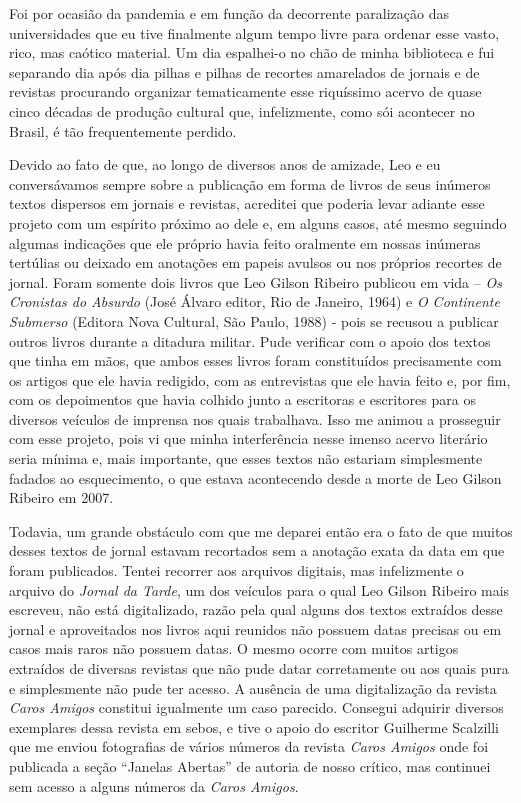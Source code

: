 \documentclass[
  a4paper,
  oneside]{scrbook}
\begin{document}
Foi por ocasião da pandemia e em função da decorrente paralização das
universidades que eu tive finalmente algum tempo livre para ordenar esse
vasto, rico, mas caótico material. Um dia espalhei-o no chão de minha
biblioteca e fui separando dia após dia pilhas e pilhas de recortes
amarelados de jornais e de revistas procurando organizar tematicamente
esse riquíssimo acervo de quase cinco décadas de produção cultural que,
infelizmente, como sói acontecer no Brasil, é tão frequentemente
perdido.

Devido ao fato de que, ao longo de diversos anos de amizade, Leo e eu
conversávamos sempre sobre a publicação em forma de livros de seus
inúmeros textos dispersos em jornais e revistas, acreditei que poderia
levar adiante esse projeto com um espírito próximo ao dele e, em alguns
casos, até mesmo seguindo algumas indicações que ele próprio havia feito
oralmente em nossas inúmeras tertúlias ou deixado em anotações em papeis
avulsos ou nos próprios recortes de jornal. Foram somente dois livros
que Leo Gilson Ribeiro publicou em vida -- \emph{Os Cronistas do
Absurdo} (José Álvaro editor, Rio de Janeiro, 1964) e \emph{O Continente
Submerso} (Editora Nova Cultural, São Paulo, 1988) - pois se recusou a
publicar outros livros durante a ditadura militar. Pude verificar com o
apoio dos textos que tinha em mãos, que ambos esses livros foram
constituídos precisamente com os artigos que ele havia redigido, com as
entrevistas que ele havia feito e, por fim, com os depoimentos que havia
colhido junto a escritoras e escritores para os diversos veículos de
imprensa nos quais trabalhava. Isso me animou a prosseguir com esse
projeto, pois vi que minha interferência nesse imenso acervo literário
seria mínima e, mais importante, que esses textos não estariam
simplesmente fadados ao esquecimento, o que estava acontecendo desde a
morte de Leo Gilson Ribeiro em 2007.

Todavia, um grande obstáculo com que me deparei então era o fato de que
muitos desses textos de jornal estavam recortados sem a anotação exata
da data em que foram publicados. Tentei recorrer aos arquivos digitais,
mas infelizmente o arquivo do \emph{Jornal da Tarde}, um dos veículos
para o qual Leo Gilson Ribeiro mais escreveu, não está digitalizado,
razão pela qual alguns dos textos extraídos desse jornal e aproveitados
nos livros aqui reunidos não possuem datas precisas ou em casos mais
raros não possuem datas. O mesmo ocorre com muitos artigos extraídos de
diversas revistas que não pude datar corretamente ou aos quais pura e
simplesmente não pude ter acesso. A ausência de uma digitalização da
revista \emph{Caros Amigos} constitui igualmente um caso parecido.
Consegui adquirir diversos exemplares dessa revista em sebos, e tive o
apoio do escritor Guilherme Scalzilli que me enviou fotografias de
vários números da revista \emph{Caros Amigos} onde foi publicada a seção
``Janelas Abertas'' de autoria de nosso crítico, mas continuei sem
acesso a alguns números da \emph{Caros Amigos}.
\end{document}
